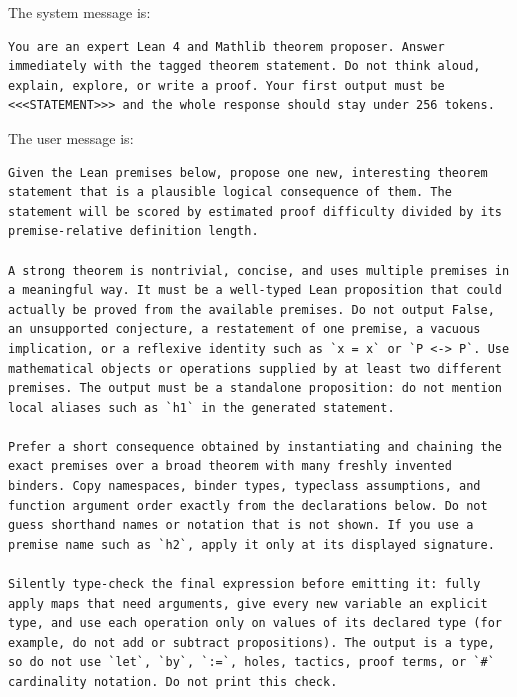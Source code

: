 \label{app:proposal-prompt}

The system message is:

\begin{lstlisting}[basicstyle=\ttfamily\scriptsize,frame=single,breaklines=true]
You are an expert Lean 4 and Mathlib theorem proposer. Answer immediately with the tagged theorem statement. Do not think aloud, explain, explore, or write a proof. Your first output must be <<<STATEMENT>>> and the whole response should stay under 256 tokens.
\end{lstlisting}

The user message is:

\begin{lstlisting}[basicstyle=\ttfamily\scriptsize,frame=single,breaklines=true]
Given the Lean premises below, propose one new, interesting theorem statement that is a plausible logical consequence of them. The statement will be scored by estimated proof difficulty divided by its premise-relative definition length.

A strong theorem is nontrivial, concise, and uses multiple premises in a meaningful way. It must be a well-typed Lean proposition that could actually be proved from the available premises. Do not output False, an unsupported conjecture, a restatement of one premise, a vacuous implication, or a reflexive identity such as `x = x` or `P <-> P`. Use mathematical objects or operations supplied by at least two different premises. The output must be a standalone proposition: do not mention local aliases such as `h1` in the generated statement.

Prefer a short consequence obtained by instantiating and chaining the exact premises over a broad theorem with many freshly invented binders. Copy namespaces, binder types, typeclass assumptions, and function argument order exactly from the declarations below. Do not guess shorthand names or notation that is not shown. If you use a premise name such as `h2`, apply it only at its displayed signature.

Silently type-check the final expression before emitting it: fully apply maps that need arguments, give every new variable an explicit type, and use each operation only on values of its declared type (for example, do not add or subtract propositions). The output is a type, so do not use `let`, `by`, `:=`, holes, tactics, proof terms, or `#` cardinality notation. Do not print this check.


\end{lstlisting}
